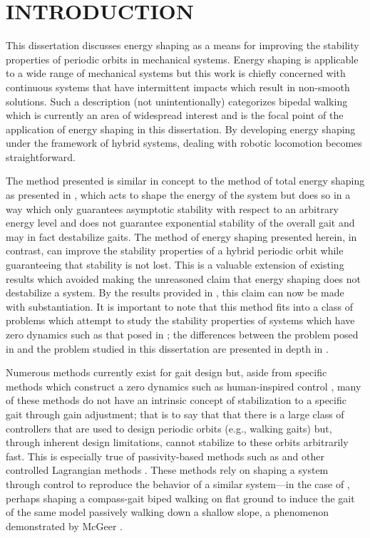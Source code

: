 \chapter{\uppercase{Introduction}}

This dissertation discusses energy shaping as a means for improving the
stability properties of periodic orbits in mechanical systems.
%
Energy shaping is applicable to a wide range of mechanical systems but this work
is chiefly concerned with continuous systems that have intermittent impacts
\cite{Brogliato1996} which result in non-smooth solutions.
%
Such a description (not unintentionally) categorizes bipedal walking which is
currently an area of widespread interest and is the focal point of the
application of energy shaping in this dissertation.
%
By developing energy shaping under the framework of hybrid systems, dealing with
robotic locomotion becomes straightforward.
%

The method presented is similar in concept to the method of total energy shaping
as presented in \cite{Spong2007}, which acts to shape the energy of the system
but does so in a way which only guarantees asymptotic stability with respect to
an arbitrary energy level and does not guarantee exponential stability of the
overall gait and may in fact destabilize gaits.
%
The method of energy shaping presented herein, in contrast, can improve the
stability properties of a hybrid periodic orbit while guaranteeing that
stability is not lost.
%
This is a valuable extension of existing results which avoided making the
unreasoned claim that energy shaping does not destabilize a system.
%
By the results provided in , this claim can now be
made with substantiation.
%
It is important to note that this method fits into a class of problems which
attempt to study the stability properties of systems which have zero dynamics
such as that posed in \cite{Ames2014};
%
the differences between the problem posed in \cite{Ames2014} and the problem
studied in this dissertation are presented in depth in
.

Numerous methods currently exist for gait design but, aside from specific
methods which construct a zero dynamics such as human-inspired control
\cite{Grizzle2014}, many of these methods do not have an intrinsic concept of
stabilization to a specific gait through gain adjustment;
%
that is to say that that there is a large class of controllers that are used to
design periodic orbits (e.g., walking gaits) but, through inherent design
limitations, cannot stabilize to these orbits arbitrarily fast.
%
This is especially true of passivity-based methods such as \csx \cite{Spong2005}
and other controlled Lagrangian methods \cite{Bloch2001,Bloch2000}.
%
These methods rely on shaping a system through control to reproduce the behavior
of a similar system---in the case of \csx, perhaps shaping a compass-gait biped
walking on flat ground to induce the gait of the same model passively walking
down a shallow slope, a phenomenon demonstrated by McGeer \cite{McGeer1990}.


